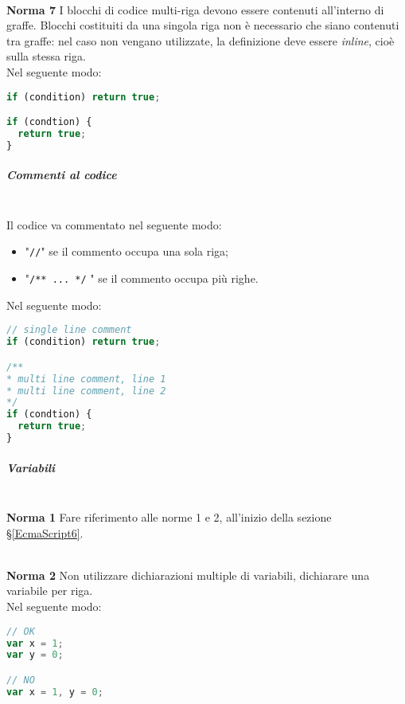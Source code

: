 \-\\
\textbf{Norma 7}
I blocchi di codice multi-riga devono essere contenuti all'interno di graffe. Blocchi costituiti da una singola riga non è necessario che siano contenuti tra graffe: nel caso non vengano utilizzate, la definizione deve essere \textit{inline}, cioè sulla stessa riga.\\
Nel seguente modo:
\begin{lstlisting}[language=JavaScript]
if (condition) return true;

if (condtion) {
  return true;
}
\end{lstlisting}

\subparagraph{Commenti al codice}\-\\
Il codice va commentato nel seguente modo:
\begin{itemize}
	\item "\texttt{//}" se il commento occupa una sola riga;
	\item "\texttt{/** ... */} " se il commento occupa più righe.
\end{itemize}
Nel seguente modo:
\begin{lstlisting}[language=JavaScript]
// single line comment
if (condition) return true;

/**
* multi line comment, line 1
* multi line comment, line 2
*/
if (condtion) {
  return true;
}
\end{lstlisting}

\subparagraph{Variabili}\-\\
\textbf{Norma 1}
Fare riferimento alle norme 1 e 2, all'inizio della sezione §\ref{EcmaScript6}.

\-\\
\textbf{Norma 2}
Non utilizzare dichiarazioni multiple di variabili, dichiarare una variabile per riga.\\
Nel seguente modo:
\begin{lstlisting}[language=JavaScript]
// OK
var x = 1;
var y = 0;

// NO
var x = 1, y = 0;
\end{lstlisting}



